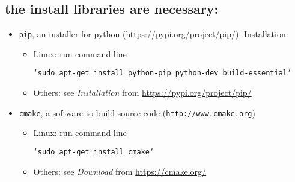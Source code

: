 \subsection{the install libraries are necessary:}
\begin{itemize}
\item \texttt{pip}, an installer for python (\url{https://pypi.org/project/pip/}). 
Installation:
\begin{itemize}
\item Linux: run command line 

\texttt{`sudo apt-get install python-pip python-dev build-essential`}
\item Others: see \textit{Installation} from \url{https://pypi.org/project/pip/}
\end{itemize}
\item \texttt{cmake}, a software to build source code (\texttt{http://www.cmake.org})
\begin{itemize}
\item Linux: run command line 

\texttt{`sudo apt-get install cmake`}
\item Others: see \textit{Download} from \url{https://cmake.org/}
\end{itemize}
\end{itemize}




